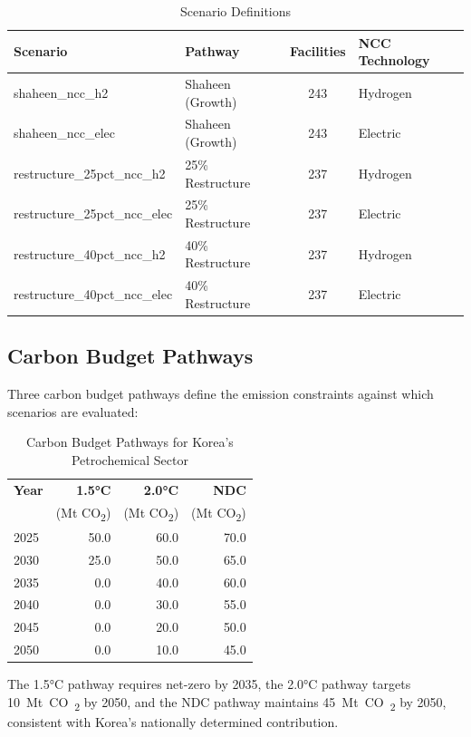 \documentclass[12pt,a4paper]{article}
\newcommand{\COtwo}{CO\textsubscript{2}}
\begin{document}
\begin{table}[H]
\centering
\caption{Scenario Definitions}
\label{tab:scenarios}
\begin{tabular}{@{}llcl@{}}
\toprule
\textbf{Scenario} & \textbf{Pathway} & \textbf{Facilities} & \textbf{NCC Technology} \\
\midrule
shaheen\_ncc\_h2 & Shaheen (Growth) & 243 & Hydrogen \\
shaheen\_ncc\_elec & Shaheen (Growth) & 243 & Electric \\
restructure\_25pct\_ncc\_h2 & 25\% Restructure & 237 & Hydrogen \\
restructure\_25pct\_ncc\_elec & 25\% Restructure & 237 & Electric \\
restructure\_40pct\_ncc\_h2 & 40\% Restructure & 237 & Hydrogen \\
restructure\_40pct\_ncc\_elec & 40\% Restructure & 237 & Electric \\
\bottomrule
\end{tabular}
\end{table}

\subsection{Carbon Budget Pathways}

Three carbon budget pathways define the emission constraints against which scenarios are evaluated:

\begin{table}[H]
\centering
\caption{Carbon Budget Pathways for Korea's Petrochemical Sector}
\label{tab:carbon_budgets}
\begin{tabular}{@{}lrrr@{}}
\toprule
\textbf{Year} & \textbf{1.5°C} & \textbf{2.0°C} & \textbf{NDC} \\
 & (Mt \COtwo) & (Mt \COtwo) & (Mt \COtwo) \\
\midrule
2025 & 50.0 & 60.0 & 70.0 \\
2030 & 25.0 & 50.0 & 65.0 \\
2035 & 0.0 & 40.0 & 60.0 \\
2040 & 0.0 & 30.0 & 55.0 \\
2045 & 0.0 & 20.0 & 50.0 \\
2050 & 0.0 & 10.0 & 45.0 \\
\bottomrule
\end{tabular}
\end{table}

The 1.5°C pathway requires net-zero by 2035, the 2.0°C pathway targets \SI{10}{Mt~\COtwo} by 2050, and the NDC pathway maintains \SI{45}{Mt~\COtwo} by 2050, consistent with Korea's nationally determined contribution.
\end{document}
